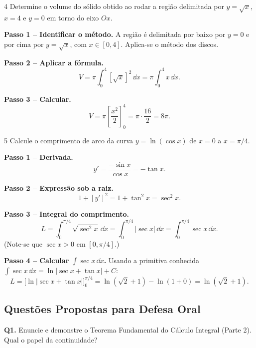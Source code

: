 \begin{exercisebox}{4}
  Determine o volume do sólido obtido ao rodar a região delimitada por
  $y=\sqrt{x}$, $x=4$ e $y=0$ em torno do eixo $Ox$.
\end{exercisebox}
\begin{solbox}
  \textbf{Passo 1 -- Identificar o método.} A região é delimitada por baixo por
  $y=0$ e por cima por $y=\sqrt{x}$, com $x\in[0,4]$. Aplica-se o método dos
  discos.

  \textbf{Passo 2 -- Aplicar a fórmula.}
  \[
    V = \pi\int_0^4 [\sqrt{x}]^2\,\dd x = \pi\int_0^4 x\,\dd x.
  \]

  \textbf{Passo 3 -- Calcular.}
  \[
    V = \pi\left[\frac{x^2}{2}\right]_0^4 = \pi\cdot\frac{16}{2} = 8\pi.
  \]
\end{solbox}

\begin{exercisebox}{5}
  Calcule o comprimento de arco da curva $y = \ln(\cos x)$ de $x=0$ a
  $x=\pi/4$.
\end{exercisebox}
\begin{solbox}
  \textbf{Passo 1 -- Derivada.}
  \[
    y' = \frac{-\sin x}{\cos x} = -\tan x.
  \]

  \textbf{Passo 2 -- Expressão sob a raiz.}
  \[
    1+[y']^2 = 1+\tan^2 x = \sec^2 x.
  \]

  \textbf{Passo 3 -- Integral do comprimento.}
  \[
    L = \int_0^{\pi/4}\sqrt{\sec^2 x}\,\dd x = \int_0^{\pi/4}|\sec x|\,\dd x
    = \int_0^{\pi/4}\sec x\,\dd x.
  \]
  (Note-se que $\sec x > 0$ em $[0,\pi/4]$.)

  \textbf{Passo 4 -- Calcular $\displaystyle\int\sec x\,\dd x$.}
  Usando a primitiva conhecida $\displaystyle\int\sec x\,\dd x = \ln|\sec x+\tan x|+C$:
  \[
    L = \Big[\ln|\sec x + \tan x|\Big]_0^{\pi/4}
    = \ln\!\left(\sqrt{2}+1\right) - \ln(1+0)
    = \ln(\sqrt{2}+1).
  \]
\end{solbox}

\subsection{Questões Propostas para Defesa Oral}

\begin{oralbox}
  \textbf{Q1.} Enuncie e demonstre o Teorema Fundamental do Cálculo Integral
  (Parte 2). Qual o papel da continuidade?
\end{oralbox}

